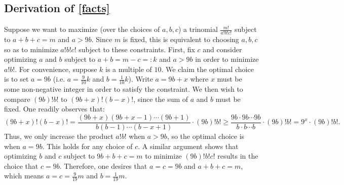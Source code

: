 \documentclass[twoside,11pt]{article}
\begin{document}
\subsection{Derivation of \eqref{facts}}\label{app:facts}
Suppose we want to maximize (over the choices of $a,b,c$) a trinomial $\frac{m!}{a!b!c!}$ subject to $a+b+c=m$ and $a>9b$. Since $m$ is fixed, this is equivalent to choosing $a,b,c$ so as to minimize $a!b!c!$ subject to these constraints. First, fix $c$ and consider optimizing $a$ and $b$ subject to $a+b = m-c =: k$ and $a>9b$ in order to minimize $a!b!$. For convenience, suppose $k$ is a multiple of $10$. We claim the optimal choice is to set $a=9b$ (i.e. $a = \frac{9}{10}k$ and $b=\frac{1}{10}k$). Write $a = 9b + x$ where $x$ must be some non-negative integer in order to satisfy the constraint. We then wish to compare $(9b)!b!$ to $(9b+x)!(b-x)!$, since the sum of $a$ and $b$ must be fixed. One readily observes that:
$$
(9b+x)!(b-x)! = \frac{(9b+x)(9b+x-1)\cdots(9b+1)}{b(b-1)\cdots(b-x+1)}\cdot (9b)!b! \geq \frac{9b\cdot 9b\cdots 9b}{b\cdot b\cdots b}\cdot (9b)!b! = 9^x\cdot (9b)!b!.
$$
Thus, we only increase the product $a!b!$ when $a>9b$, so the optimal choice is when $a=9b$. This holds for any choice of $c$.  A similar argument shows that optimizing $b$ and $c$ subject to $9b + b + c = m$ to minimize $(9b)!b!c!$ results in the choice that $c=9b$.  Therefore, one desires that $a=c=9b$ and $a+b+c=m$, which means $a=c=\frac{9}{19}m$ and $b=\frac{1}{19}m$.




\end{document}
